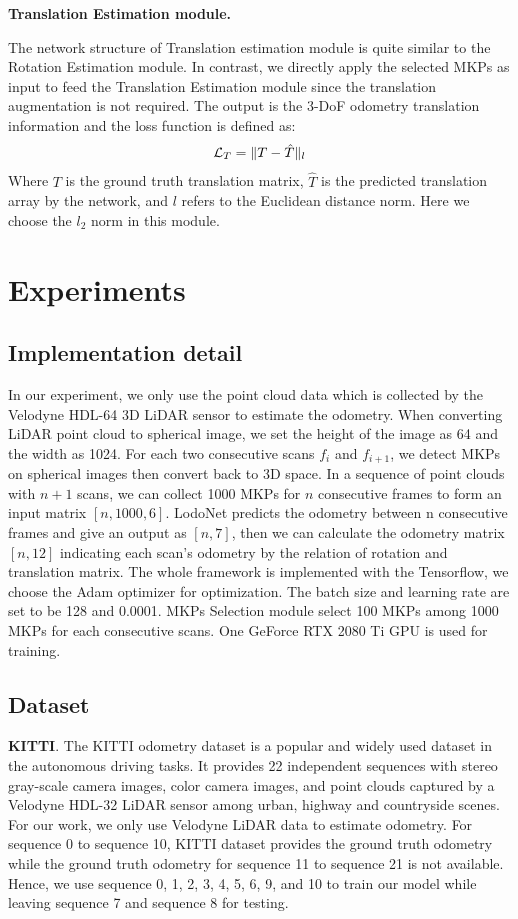 \documentclass[sigconf]{acmart}
\def\lodo{LodoNet}
\newcommand{\bfsection}[1]{\vspace*{0.1cm}\noindent\textbf{#1.}}
\begin{document}
\bfsection{Translation Estimation module}

The network structure of Translation estimation module is quite similar to the Rotation Estimation module. In contrast, we directly apply the selected MKPs as input to feed the Translation Estimation module since the translation augmentation is not required. The output is the 3-DoF odometry translation information and the loss function is defined as: 
\begin{align}
\small
    \mathcal{L}_T =\|  T - \hat{T} \|_l 
\end{align}
Where $T$ is the ground truth translation matrix, $\hat{T}$ is the predicted translation array by the network, and $l$ refers to the Euclidean distance norm. Here we choose the $l_2$ norm in this module. 

\section{Experiments}
\subsection{Implementation detail}
\label{section:Implementation detail}
In our experiment, we only use the point cloud data which is collected by the Velodyne HDL-64 3D LiDAR sensor to estimate the odometry. When converting LiDAR point cloud to spherical image, we set the height of the image as 64 and the width as 1024. For each two consecutive scans $f_i$ and $f_{i+1}$, we detect MKPs on spherical images then convert back to 3D space. In a sequence of point clouds with $n+1$ scans, we can collect 1000 MKPs for $n$ consecutive frames to form an input matrix $[n, 1000, 6]$. \lodo{} predicts the odometry between n consecutive frames and give an output as $[n, 7]$, then we can calculate the odometry matrix $[n, 12]$ indicating each scan’s odometry by the relation of rotation and translation matrix. The whole framework is implemented with the Tensorflow, we choose the Adam optimizer\cite{adam} for optimization. The batch size and learning rate are set to be 128 and 0.0001. MKPs Selection module select 100 MKPs among 1000 MKPs for each consecutive scans. One GeForce RTX 2080 Ti GPU is used for training. 

\subsection{Dataset}

\quad \textbf{KITTI}. The KITTI odometry dataset\cite{kitti} is a popular and widely used dataset in the autonomous driving tasks. It provides 22 independent sequences with stereo gray-scale camera images, color camera images, and point clouds captured by a Velodyne HDL-32 LiDAR sensor among urban, highway and countryside scenes. For our work, we only use Velodyne LiDAR data to estimate odometry. For sequence 0 to sequence 10, KITTI dataset provides the ground truth odometry while the ground truth odometry for sequence 11 to sequence 21 is not available. Hence, we use sequence 0, 1, 2, 3, 4, 5, 6, 9, and 10 to train our model while leaving sequence 7 and sequence 8 for testing. 
\end{document}
